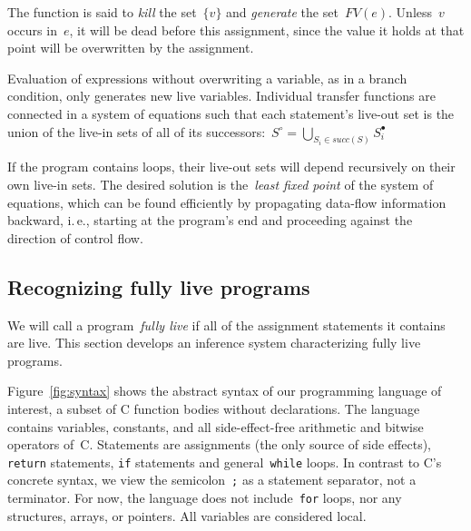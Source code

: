 \documentclass{llncs}
\newcommand{\liveout}[1]{\ensuremath{#1^{\circ}}}
\newcommand{\livein}[1]{\ensuremath{#1^{\bullet}}}
\begin{document}
The function is said to \emph{kill} the set~\(\{v\}\) and \emph{generate}
the set~\(FV(e)\). Unless~\(v\) occurs in~\(e\), it will be dead before this
assignment, since the value it holds at that point will be overwritten by
the assignment.

Evaluation of expressions without overwriting a variable,
as in a branch condition, only generates new live variables. Individual
transfer functions are connected in a system of equations such that each
statement's live-out set is the union of the live-in sets of all of its
successors:~\(\liveout{S} = \bigcup_{S_i \in \mathit{succ}(S)}
\livein{S_i}\)

If the program contains loops, their live-out sets will depend recursively
on their own live-in sets. The desired solution is the~\emph{least fixed
point} of the system of equations, which can be found efficiently by
propagating data-flow information backward, i.\,e., starting at the
program's end and proceeding against the direction of control flow.


\subsection{Recognizing fully live programs}

We will call a program~\emph{fully live} if all of the assignment statements
it contains are live. This section develops an inference system
characterizing fully live programs.

Figure~\ref{fig:syntax} shows the abstract syntax of our programming
language of interest, a subset of C function bodies without declarations.
The language contains variables, constants, and all side-effect-free
arithmetic and bitwise operators of~C. Statements are assignments (the only
source of side effects), \verb|return| statements, \verb|if| statements and
general~\verb|while| loops. In contrast to C's concrete syntax, we view the
semicolon~\verb|;| as a statement separator, not a terminator. For now, the
language does not include~\verb|for| loops, nor any structures, arrays, or
pointers. All variables are considered local.
\end{document}
